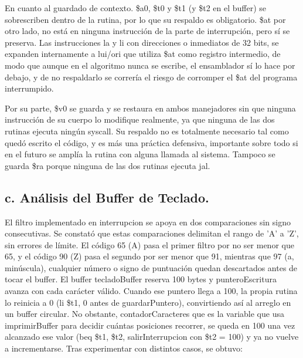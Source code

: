 \documentclass[12pt, letterpaper]{article}
\begin{document}
En cuanto al guardado de contexto. \$a0, \$t0 y \$t1 (y \$t2 en el buffer) se sobrescriben dentro de la rutina, por lo que su respaldo es obligatorio. \$at por otro lado, no está en ninguna instrucción de la parte de interrupción, pero sí se preserva. Las instrucciones la y li con direcciones o inmediatos de 32 bits, se expanden internamente a lui/ori que utiliza \$at como registro intermedio, de modo que aunque en el algoritmo nunca se escribe, el ensamblador sí lo hace por debajo, y de no respaldarlo se correría el riesgo de corromper el \$at del programa interrumpido.

Por su parte, \$v0 se guarda y se restaura en ambos manejadores sin que ninguna instrucción de su cuerpo lo modifique realmente, ya que ninguna de las dos rutinas ejecuta ningún syscall. Su respaldo no es totalmente necesario tal como quedó escrito el código, y es más una práctica defensiva, importante sobre todo si en el futuro se amplía la rutina con alguna llamada al sistema. Tampoco se guarda \$ra porque ninguna de las dos rutinas ejecuta jal.

\subsection*{c. Análisis del Buffer de Teclado.}
El filtro implementado en interrupcion se apoya en dos comparaciones sin signo consecutivas. Se constató que estas comparaciones delimitan el rango de 'A' a 'Z', sin errores de límite. El código 65 (A) pasa el primer filtro por no ser menor que 65, y el código 90 (Z) pasa el segundo por ser menor que 91, mientras que 97 (a, minúscula), cualquier número o signo de puntuación quedan descartados antes de tocar el buffer.
El buffer tecladoBuffer reserva 100 bytes y punteroEscritura avanza con cada carácter válido. Cuando ese puntero llega a 100, la propia rutina lo reinicia a 0 (li \$t1, 0 antes de guardarPuntero), convirtiendo así al arreglo en un buffer circular. No obstante, contadorCaracteres que es la variable que usa imprimirBuffer para decidir cuántas posiciones recorrer, se queda en 100 una vez alcanzado ese valor (beq \$t1, \$t2, salirInterrupcion con \$t2 = 100) y ya no vuelve a incrementarse. Tras experimentar con distintos casos, se obtuvo:
\end{document}
